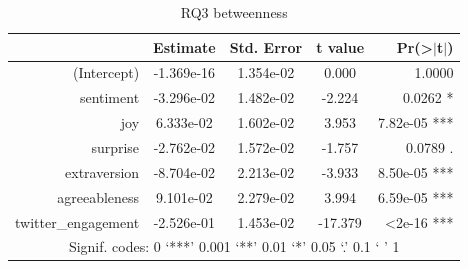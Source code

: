 \documentclass[bsc,frontabs,twoside,singlespacing,parskip,deptreport]{infthesis}
\begin{document}
\begin{table}[!h]
\centering
{}
\caption{Summary of stepwise regression results for RQ3}
\label{tab:stepwise-rq3}
\end{table}

\newpage

\begin{table}[]
\centering
\caption{RQ3 betweenness}
\begin{tabular}{rcccr}
\hline
                    & Estimate & Std. Error     & t value & Pr(\textgreater{}$\rvert$t$\rvert$) \\ \hline
(Intercept)         & -1.369e-16    & 1.354e-02 & 0.000   & 1.0000                              \\
sentiment           & -3.296e-02    & 1.482e-02 & -2.224  & 0.0262 *                            \\
joy                 & 6.333e-02     & 1.602e-02 & 3.953   & 7.82e-05 ***                        \\
surprise            & -2.762e-02    & 1.572e-02 & -1.757  & 0.0789 .                            \\
extraversion        & -8.704e-02    & 2.213e-02 & -3.933  & 8.50e-05 ***                        \\
agreeableness       & 9.101e-02     & 2.279e-02 & 3.994   & 6.59e-05 ***                        \\
twitter\_engagement & -2.526e-01    & 1.453e-02 & -17.379 & \textless 2e-16 ***                 \\ \hline
\multicolumn{5}{c}{Signif. codes: 0 ‘***’ 0.001 ‘**’ 0.01 ‘*’ 0.05 ‘.’ 0.1 ‘ ’ 1}               \\ \hline
\end{tabular}
\end{table}
\end{document}
